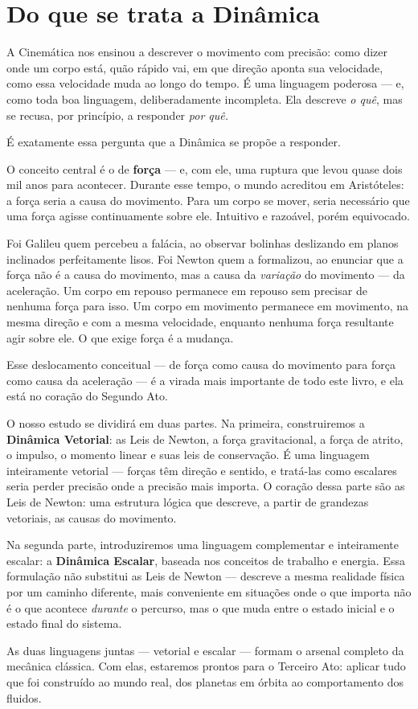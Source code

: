 

\chapter*{Do que se trata a Dinâmica}

A Cinemática nos ensinou a descrever o movimento com precisão: como
dizer onde um corpo está, quão rápido vai, em que direção aponta sua
velocidade, como essa velocidade muda ao longo do tempo. É uma
linguagem poderosa --- e, como toda boa linguagem, deliberadamente
incompleta. Ela descreve \textit{o quê}, mas se recusa, por princípio,
a responder \textit{por quê.}

É exatamente essa pergunta que a Dinâmica se propõe a responder.

O conceito central é o de \textbf{força} --- e, com ele, uma ruptura
que levou quase dois mil anos para acontecer. Durante esse tempo, o
mundo acreditou em Aristóteles: a força seria a causa do movimento.
Para um corpo se mover, seria necessário que uma força agisse
continuamente sobre ele. Intuitivo e razoável, porém equivocado.

Foi Galileu quem percebeu a falácia, ao observar bolinhas deslizando
em planos inclinados perfeitamente lisos. Foi Newton quem a
formalizou, ao enunciar que a força não é a causa do movimento, mas
a causa da \textit{variação} do movimento --- da aceleração. Um corpo
em repouso permanece em repouso sem precisar de nenhuma força para
isso. Um corpo em movimento permanece em movimento, na mesma direção
e com a mesma velocidade, enquanto nenhuma força resultante agir sobre
ele. O que exige força é a mudança.

Esse deslocamento conceitual --- de força como causa do movimento para
força como causa da aceleração --- é a virada mais importante de todo
este livro, e ela está no coração do Segundo Ato.

O nosso estudo se dividirá em duas partes. Na primeira, construiremos
a \textbf{Dinâmica Vetorial}: as Leis de Newton, a força gravitacional,
a força de atrito, o impulso, o momento linear e suas leis de
conservação. É uma linguagem inteiramente vetorial --- forças têm
direção e sentido, e tratá-las como escalares seria perder precisão
onde a precisão mais importa. O coração dessa parte são as Leis de Newton: uma estrutura lógica que descreve, a partir de grandezas vetoriais, as causas do movimento.

Na segunda parte, introduziremos uma linguagem complementar e
inteiramente escalar: a \textbf{Dinâmica Escalar}, baseada nos
conceitos de trabalho e energia. Essa formulação não substitui as
Leis de Newton --- descreve a mesma realidade física por um caminho
diferente, mais conveniente em situações onde o que importa não é
o que acontece \textit{durante} o percurso, mas o que muda entre o
estado inicial e o estado final do sistema.

As duas linguagens juntas --- vetorial e escalar --- formam o arsenal
completo da mecânica clássica. Com elas, estaremos prontos para o
Terceiro Ato: aplicar tudo que foi construído ao mundo real, dos
planetas em órbita ao comportamento dos fluidos.